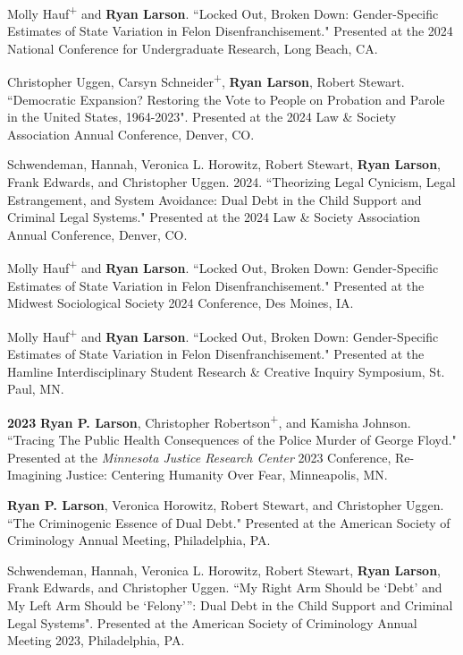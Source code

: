 \documentclass[letterpaper]{article}
\newenvironment{publist}{%
  \begin{list}{}{%
    \setlength{\leftmargin}{0cm}   %
    \setlength{\labelwidth}{2cm}     %
    \setlength{\labelsep}{0.5cm}     %
  }%
}{%
  \end{list}%
}
\begin{document}
\begin{publist}
\item Molly Hauf\textsuperscript{+} and \textbf{Ryan Larson}. ``Locked Out, Broken Down: Gender-Specific Estimates of State Variation in Felon Disenfranchisement." Presented at the 2024 National Conference for Undergraduate Research, Long Beach, CA. 

\item Christopher Uggen, Carsyn Schneider\textsuperscript{+}, \textbf{Ryan Larson}, Robert Stewart. ``Democratic Expansion? Restoring the Vote to People on Probation and Parole in the United States, 1964-2023". Presented at the 2024 Law \& Society Association Annual Conference, Denver, CO. 

\item Schwendeman, Hannah, Veronica L. Horowitz, Robert Stewart, \textbf{Ryan Larson}, Frank Edwards, and Christopher Uggen. 2024.  ``Theorizing Legal Cynicism, Legal Estrangement, and System Avoidance: Dual Debt in the Child Support and Criminal Legal Systems." Presented at the 2024 Law \& Society Association Annual Conference, Denver, CO. 

\item Molly Hauf\textsuperscript{+} and \textbf{Ryan Larson}. ``Locked Out, Broken Down: Gender-Specific Estimates of State Variation in Felon Disenfranchisement." Presented at the Midwest Sociological Society 2024 Conference, Des Moines, IA. 

\item Molly Hauf\textsuperscript{+} and \textbf{Ryan Larson}. ``Locked Out, Broken Down: Gender-Specific Estimates of State Variation in Felon Disenfranchisement." Presented at the Hamline Interdisciplinary Student Research \& Creative Inquiry Symposium, St. Paul, MN. 

\item[\textbf{2023}] \textbf{Ryan P. Larson}, Christopher Robertson\textsuperscript{+}, and Kamisha Johnson. ``Tracing The Public Health Consequences of the Police Murder of George Floyd." Presented at the \textit{Minnesota Justice Research Center} 2023 Conference, Re-Imagining Justice: Centering Humanity Over Fear, Minneapolis, MN.   

\item \textbf{Ryan P. Larson}, Veronica Horowitz, Robert Stewart, and Christopher Uggen. ``The Criminogenic Essence of Dual Debt." Presented at the American Society of Criminology Annual Meeting, Philadelphia, PA. 

\item Schwendeman, Hannah, Veronica L. Horowitz, Robert Stewart, \textbf{Ryan Larson}, Frank Edwards, and Christopher Uggen. ``My Right Arm Should be ‘Debt’ and My Left Arm Should be ‘Felony’”:
Dual Debt in the Child Support and Criminal Legal Systems". Presented at the American Society of Criminology Annual Meeting 2023, Philadelphia, PA. 


\end{publist}
\end{document}
